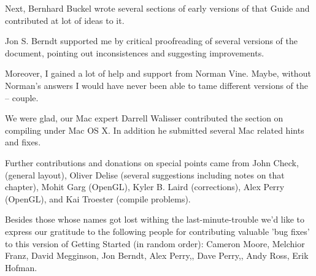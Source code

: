 Next, Bernhard Buckel  wrote several sections of early versions
of that Guide and contributed at lot of ideas to it.

Jon S. Berndt  supported me by critical proofreading of several
versions of the document, pointing out inconsistences and suggesting improvements.

Moreover, I gained a lot of help and support from Norman Vine. Maybe,
without Norman's answers I would have never been able to tame different versions of the
\Cygwin{} -- \FlightGear{} couple.

We were glad, our Mac expert Darrell Walisser  contributed the section on compiling under Mac OS X. In addition he submitted several Mac related hints and fixes.

Further contributions and donations on special points came from John Check, (general layout), Oliver Delise  (several suggestions
including notes on that chapter), Mohit Garg  (OpenGL), Kyler B. Laird
 (corrections), Alex Perry (OpenGL), and Kai
Troester (compile problems).

Besides those whose names got lost withing the last-minute-trouble we'd like to express our
gratitude to the following people for contributing valuable 'bug fixes' to this version of Getting Started (in random order): Cameron Moore, Melchior Franz, David Megginson, Jon Berndt, Alex Perry,, Dave Perry,, Andy Ross, Erik Hofman. 

